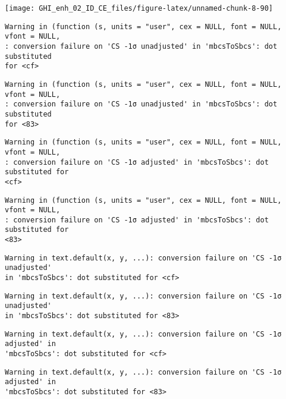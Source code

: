 \documentclass[
  10pt,
  a4paper,oneside]{article}
\begin{document}
\begin{center}\texttt{[image: GHI\_enh\_02\_ID\_CE\_files/figure-latex/unnamed-chunk-8-90]} \end{center}

\begin{verbatim}
Warning in (function (s, units = "user", cex = NULL, font = NULL, vfont = NULL,
: conversion failure on 'CS -1σ unadjusted' in 'mbcsToSbcs': dot substituted
for <cf>
\end{verbatim}

\begin{verbatim}
Warning in (function (s, units = "user", cex = NULL, font = NULL, vfont = NULL,
: conversion failure on 'CS -1σ unadjusted' in 'mbcsToSbcs': dot substituted
for <83>
\end{verbatim}

\begin{verbatim}
Warning in (function (s, units = "user", cex = NULL, font = NULL, vfont = NULL,
: conversion failure on 'CS -1σ adjusted' in 'mbcsToSbcs': dot substituted for
<cf>
\end{verbatim}

\begin{verbatim}
Warning in (function (s, units = "user", cex = NULL, font = NULL, vfont = NULL,
: conversion failure on 'CS -1σ adjusted' in 'mbcsToSbcs': dot substituted for
<83>
\end{verbatim}

\begin{verbatim}
Warning in text.default(x, y, ...): conversion failure on 'CS -1σ unadjusted'
in 'mbcsToSbcs': dot substituted for <cf>
\end{verbatim}

\begin{verbatim}
Warning in text.default(x, y, ...): conversion failure on 'CS -1σ unadjusted'
in 'mbcsToSbcs': dot substituted for <83>
\end{verbatim}

\begin{verbatim}
Warning in text.default(x, y, ...): conversion failure on 'CS -1σ adjusted' in
'mbcsToSbcs': dot substituted for <cf>
\end{verbatim}

\begin{verbatim}
Warning in text.default(x, y, ...): conversion failure on 'CS -1σ adjusted' in
'mbcsToSbcs': dot substituted for <83>
\end{verbatim}
\end{document}
